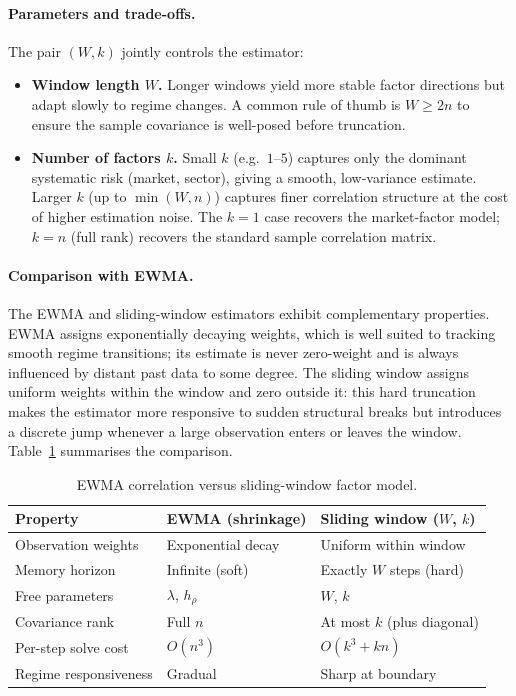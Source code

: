 \documentclass[11pt,a4paper]{article}
\begin{document}
\paragraph{Parameters and trade-offs.}
The pair $(W, k)$ jointly controls the estimator:
\begin{itemize}
  \item \textbf{Window length $W$.}  Longer windows yield more stable factor
    directions but adapt slowly to regime changes.  A common rule of thumb is
    $W \geq 2n$ to ensure the sample covariance is well-posed before
    truncation.
  \item \textbf{Number of factors $k$.}  Small $k$ (e.g.\ $1$--$5$) captures
    only the dominant systematic risk (market, sector), giving a smooth,
    low-variance estimate.  Larger $k$ (up to $\min(W, n)$) captures finer
    correlation structure at the cost of higher estimation noise.  The
    $k = 1$ case recovers the market-factor model; $k = n$ (full rank)
    recovers the standard sample correlation matrix.
\end{itemize}

\paragraph{Comparison with EWMA.}
The EWMA and sliding-window estimators exhibit complementary properties.
EWMA assigns exponentially decaying weights, which is well suited to tracking
smooth regime transitions; its estimate is never zero-weight and is always
influenced by distant past data to some degree.  The sliding window assigns
uniform weights within the window and zero outside it: this hard truncation
makes the estimator more responsive to sudden structural breaks but introduces
a discrete jump whenever a large observation enters or leaves the window.
Table~\ref{tab:ewma_vs_sliding} summarises the comparison.

\begin{table}[h]
  \centering
  \caption{EWMA correlation versus sliding-window factor model.}
  \label{tab:ewma_vs_sliding}
  \begin{tabular}{lll}
    \toprule
    \textbf{Property} & \textbf{EWMA (shrinkage)} & \textbf{Sliding window ($W$, $k$)} \\
    \midrule
    Observation weights & Exponential decay & Uniform within window \\
    Memory horizon      & Infinite (soft)   & Exactly $W$ steps (hard) \\
    Free parameters     & $\lambda$, $h_\rho$ & $W$, $k$ \\
    Covariance rank     & Full $n$          & At most $k$ (plus diagonal) \\
    Per-step solve cost & $O(n^3)$          & $O(k^3 + kn)$ \\
    Regime responsiveness & Gradual          & Sharp at boundary \\
    \bottomrule
  \end{tabular}
\end{table}
\end{document}
